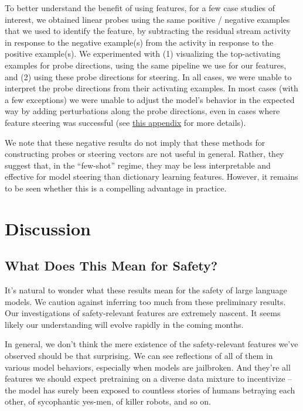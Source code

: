 \documentclass{article}
\let\oldsection\section
\renewcommand{\section}{\FloatBarrier\oldsection}
\let\oldsubsection\subsection
\renewcommand{\subsection}{\FloatBarrier\oldsubsection}
\begin{document}
To better understand the benefit of using features, for a few case studies of interest, we obtained linear probes using the same positive / negative examples that we used to identify the feature, by subtracting the residual stream activity in response to the negative example(s) from the activity in response to the positive example(s). We experimented with (1) visualizing the top-activating examples for probe directions, using the same pipeline we use for our features, and (2) using these probe directions for steering. In all cases, we were unable to interpret the probe directions from their activating examples. In most cases (with a few exceptions) we were unable to adjust the model’s behavior in the expected way by adding perturbations along the probe directions, even in cases where feature steering was successful (see \hyperref[sec:appendix-methods-steering-compare]{this appendix} for more details).

We note that these negative results do not imply that these methods for constructing probes or steering vectors are not useful in general. Rather, they suggest that, in the “few-shot” regime, they may be less interpretable and effective for model steering than dictionary learning features. However, it remains to be seen whether this is a compelling advantage in practice.

\section{Discussion}\label{sec:discussion}

\subsection{What Does This Mean for Safety?}\label{sec:discussion-safety}

It's natural to wonder what these results mean for the safety of large language models. We caution against inferring too much from these preliminary results. Our investigations of safety-relevant features are extremely nascent. It seems likely our understanding will evolve rapidly in the coming months.

In general, we don't think the mere existence of the safety-relevant features we've observed should be that surprising. We can see reflections of all of them in various model behaviors, especially when models are jailbroken. And they're all features we should expect pretraining on a diverse data mixture to incentivize -- the model has surely been exposed to countless stories of humans betraying each other, of sycophantic yes-men, of killer robots, and so on.
\end{document}
